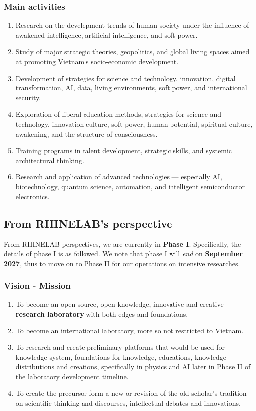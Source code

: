 \documentclass[10pt,a4paper]{article}
\begin{document}
\subsubsection{Main activities}

\begin{enumerate}[topsep=0pt,itemsep=0pt]
    \item Research on the development trends of human society under the influence of awakened intelligence, artificial intelligence, and soft power.
    \item Study of major strategic theories, geopolitics, and global living spaces aimed at promoting Vietnam's socio-economic development.
    \item Development of strategies for science and technology, innovation, digital transformation, AI, data, living environments, soft power, and international security.
    \item Exploration of liberal education methods, strategies for science and technology, innovation culture, soft power, human potential, spiritual culture, awakening, and the structure of consciousness.
    \item Training programs in talent development, strategic skills, and systemic architectural thinking.
    \item Research and application of advanced technologies — especially AI, biotechnology, quantum science, automation, and intelligent semiconductor electronics.
\end{enumerate}

\subsection{From RHINELAB's perspective}

From RHINELAB perspectives, we are currently in \textbf{Phase I}. Specifically, the details of phase I is as followed. We note that phase I will \textit{end} on \textbf{September 2027}, thus to move on to Phase II for our operations on intensive researches. 

\subsubsection{Vision - Mission}

\begin{enumerate}[topsep=0pt,itemsep=0pt]
    \item To become an open-source, open-knowledge, innovative and creative \textbf{research laboratory} with both edges and foundations. 
    \item To become an international laboratory, more so not restricted to Vietnam. 
    \item To research and create preliminary platforms that would be used for knowledge system, foundations for knowledge, educations, knowledge distributions and creations, specifically in physics and AI later in Phase II of the laboratory development timeline. 
    \item To create the precursor form a new or revision of the old scholar's tradition on scientific thinking and discourses, intellectual debates and innovations. 
\end{enumerate}
\end{document}
